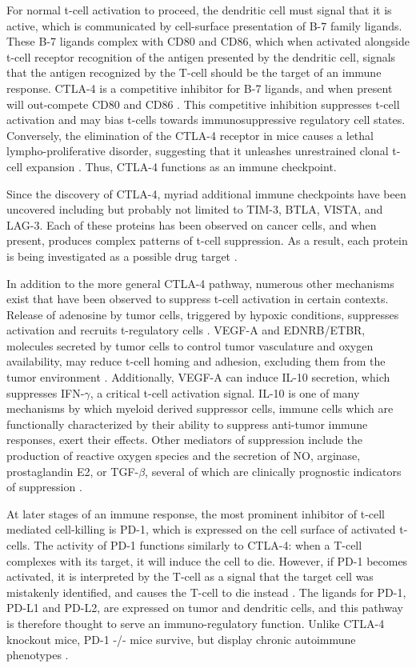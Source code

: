 For normal t-cell activation to proceed, the dendritic cell must signal that it is active, which is communicated by cell-surface presentation of B-7 family ligands. 
These B-7 ligands complex with CD80 and CD86, which when activated alongside t-cell receptor recognition of the antigen presented by the dendritic cell, signals that the antigen recognized by the T-cell should be the target of an immune response. 
CTLA-4 is a competitive inhibitor for B-7 ligands, and when present will out-compete CD80 and CD86 \citep{Qureshi2011}. 
This competitive inhibition suppresses t-cell activation \citep{Wing2008} and may bias t-cells towards immunosuppressive regulatory cell states. 
Conversely, the elimination of the CTLA-4 receptor in mice causes a lethal lympho-proliferative disorder, suggesting that it unleashes unrestrained clonal t-cell expansion \citep{Tivol1995}.
Thus, CTLA-4 functions as an immune checkpoint.

Since the discovery of CTLA-4, myriad additional immune checkpoints have been uncovered including but probably not limited to TIM-3, BTLA, VISTA, and LAG-3.
Each of these proteins has been observed on cancer cells, and when present, produces complex patterns of t-cell suppression. 
As a result, each protein is being investigated as a possible drug target \citep{Sharma2017}.

In addition to the more general CTLA-4 pathway, numerous other mechanisms exist that have been observed to suppress t-cell activation in certain contexts. 
Release of adenosine by tumor cells, triggered by hypoxic conditions, suppresses activation and recruits t-regulatory cells \citep{Ohta2006}. 
VEGF-A and EDNRB/ETBR, molecules secreted by tumor cells to control tumor vasculature and oxygen availability, may reduce t-cell homing and adhesion, excluding them from the tumor environment \citep{Bouzin2007}. 
Additionally, VEGF-A can induce IL-10 secretion, which suppresses IFN-$\gamma$, a critical t-cell activation signal. 
IL-10 is one of many mechanisms by which myeloid derived suppressor cells, immune cells which are functionally characterized by their ability to suppress anti-tumor immune responses, exert their effects. 
Other mediators of suppression include the production of reactive oxygen species and the secretion of NO, arginase, prostaglandin E2, or TGF-$\beta$, several of which are clinically prognostic indicators of suppression \citep{Muller2006}.

At later stages of an immune response, the most prominent inhibitor of t-cell mediated cell-killing is PD-1, which is expressed on the cell surface of activated t-cells.
The activity of PD-1 functions similarly to CTLA-4: when a T-cell complexes with its target, it will induce the cell to die. 
However, if PD-1 becomes activated, it is interpreted by the T-cell as a signal that the target cell was mistakenly identified, and causes the T-cell to die instead \citep{Keir2008}. 
The ligands for PD-1, PD-L1 and PD-L2, are expressed on tumor and dendritic cells, and this pathway is therefore thought to serve an immuno-regulatory function. 
Unlike CTLA-4 knockout mice, PD-1 -/- mice survive, but display chronic autoimmune phenotypes \citep{Nishimura1999,Nishimura2001}.

